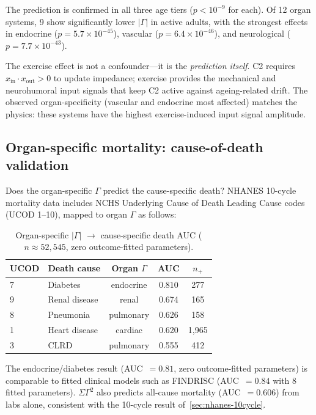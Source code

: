 \documentclass[aps,pre,twocolumn,superscriptaddress,floatfix]{revtex4-2}
\begin{document}
The prediction is confirmed in all three age tiers
($p < 10^{-9}$ for each).
Of 12 organ systems, 9 show significantly lower
$|\Gamma|$ in active adults,
with the strongest effects in endocrine
($p = 5.7 \times 10^{-45}$),
vascular ($p = 6.4 \times 10^{-46}$), and
neurological ($p = 7.7 \times 10^{-43}$).

\begin{remark}
The exercise effect is not a confounder---it is the
\emph{prediction itself}.
C2 requires $x_{\text{in}} \cdot x_{\text{out}} > 0$
to update impedance; exercise provides the mechanical and
neurohumoral input signals that keep C2 active against
ageing-related drift.
The observed organ-specificity (vascular and endocrine
most affected) matches the physics:
these systems have the highest exercise-induced
input signal amplitude.
\end{remark}


\subsection{Organ-specific mortality: cause-of-death validation}
\label{sec:organ-mortality}

Does the organ-specific $\Gamma$ predict the cause-specific
death?  NHANES 10-cycle mortality data includes NCHS
Underlying Cause of Death Leading Cause codes (UCOD 1--10),
mapped to organ $\Gamma$ as follows:

\begin{table}[h]
\centering
\caption{Organ-specific $|\Gamma|$ $\to$ cause-specific
  death AUC ($n \approx 52{,}545$, zero outcome-fitted parameters).}
\label{tab:organ-death}
\begin{tabular}{llccc}
\toprule
UCOD & Death cause & Organ $\Gamma$ & AUC & $n_+$ \\
\midrule
7  & Diabetes         & endocrine & $\mathbf{0.810}$ & 277 \\
9  & Renal disease    & renal     & 0.674 & 165 \\
8  & Pneumonia        & pulmonary & 0.626 & 158 \\
1  & Heart disease    & cardiac   & 0.620 & 1{,}965 \\
3  & CLRD             & pulmonary & 0.555 & 412 \\
\bottomrule
\end{tabular}
\end{table}

The endocrine/diabetes result (AUC~$= 0.81$,
zero outcome-fitted parameters) is comparable to fitted clinical
models such as FINDRISC (AUC~$= 0.84$ with 8 fitted parameters).
$\Sigma\Gamma^2$ also predicts all-cause mortality
(AUC~$= 0.606$) from labs alone, consistent
with the 10-cycle result of~\ref{sec:nhanes-10cycle}.
\end{document}
